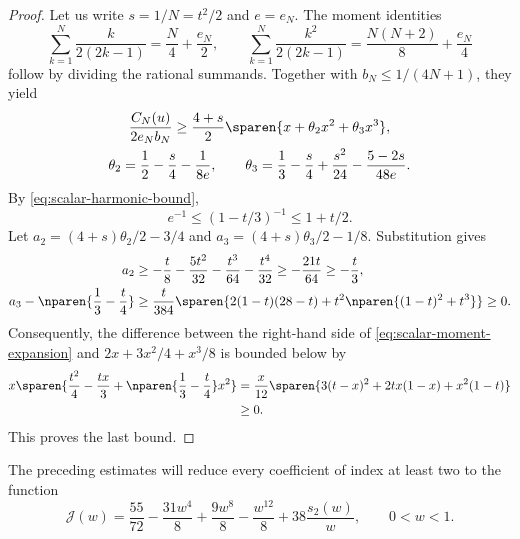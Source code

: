 \begin{proof}
Let us write $s=1/N=t^2/2$ and $e=e_N$. The moment identities
\begin{equation*}
  \sum_{k=1}^N\frac{k}{2(2k-1)}=\frac N4+\frac{e_N}{2},\qquad
  \sum_{k=1}^N\frac{k^2}{2(2k-1)}=\frac{N(N+2)}8+\frac{e_N}{4}
\end{equation*}
follow by dividing the rational summands.
Together with $b_N\le1/(4N+1)$, they yield
\begin{equation}
  \label{eq:scalar-moment-expansion}
  \begin{gathered}
    \frac{C_N(u)}{2e_Nb_N}
    \ge\frac{4+s}{2}\sparen{x+\theta_2x^2+\theta_3x^3},\\
    \theta_2=\frac12-\frac s4-\frac{1}{8e},\qquad
    \theta_3=\frac13-\frac s4+\frac{s^2}{24}
    -\frac{5-2s}{48e}.
  \end{gathered}
\end{equation}
By \eqref{eq:scalar-harmonic-bound},
\begin{equation*}
  e^{-1}\le(1-t/3)^{-1}\le1+t/2.
\end{equation*}
Let
$a_2=(4+s)\theta_2/2-3/4$ and
$a_3=(4+s)\theta_3/2-1/8$.
Substitution gives
\begin{align*}
  a_2&\ge-\frac t8-\frac{5t^2}{32}-\frac{t^3}{64}
  -\frac{t^4}{32}
  \ge-\frac{21t}{64}\ge-\frac t3,\\
  a_3-\nparen{\frac13-\frac t4}
  &\ge\frac{t}{384}
  \sparen{2(1-t)(28-t)+t^2\nparen{(1-t)^2+t^3}}
  \ge0.
\end{align*}
Consequently, the difference between the right-hand side of
\eqref{eq:scalar-moment-expansion} and
$2x+3x^2/4+x^3/8$ is bounded below by
\begin{align*}
  x\sparen{\frac{t^2}{4}-\frac{tx}{3}
  +\nparen{\frac13-\frac t4}x^2}
  &=\frac{x}{12}
  \sparen{3(t-x)^2+2tx(1-x)+x^2(1-t)}\\
  &\ge0.
\end{align*}
This proves the last bound.
\end{proof}
The preceding estimates will reduce every coefficient of index at
least two to the function
\begin{equation*}
  \mathcal J(w)=\frac{55}{72}-\frac{31w^4}{8}
  +\frac{9w^8}{8}-\frac{w^{12}}8
  +38\frac{s_2(w)}w,\qquad 0<w<1.
\end{equation*}

